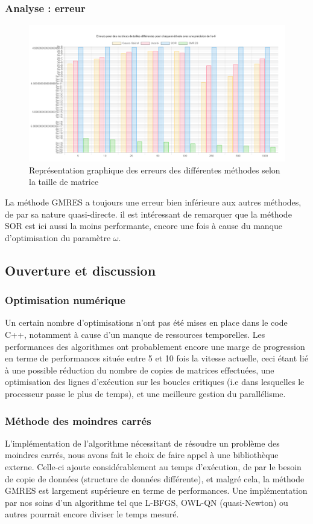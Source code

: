 \subsubsection{Analyse : erreur}
\begin{figure}[H]
	\centering
	\includegraphics[width=0.8\linewidth]{images/errors.PNG}
	\caption{Représentation graphique des erreurs des différentes méthodes selon la taille de matrice}
\end{figure}

La méthode GMRES a toujours une erreur bien inférieure aux autres méthodes, de par sa nature quasi-directe. il est intéressant de remarquer que la méthode SOR est ici aussi la moins performante, encore une fois à cause du manque d'optimisation du paramètre $\omega$.



\subsection{Ouverture et discussion}
\subsubsection{Optimisation numérique}
Un certain nombre d'optimisations n'ont pas été mises en place dans le code C++, notamment à cause d'un manque de ressources temporelles. Les performances des algorithmes ont probablement encore une marge de progression en terme de performances située entre 5 et 10 fois la vitesse actuelle, ceci étant lié à une possible réduction du nombre de copies de matrices effectuées, une optimisation des lignes d'exécution sur les boucles critiques (i.e dans lesquelles le processeur passe le plus de temps), et une meilleure gestion du parallélisme.


\subsubsection{Méthode des moindres carrés}
L'implémentation de l'algorithme nécessitant de résoudre un problème des moindres carrés, nous avons fait le choix de faire appel à une bibliothèque externe. Celle-ci ajoute considérablement au temps d'exécution, de par le besoin de copie de données (structure de données différente), et malgré cela, la méthode GMRES est largement supérieure en terme de performances. Une implémentation par nos soins d'un algorithme tel que L-BFGS, OWL-QN (quasi-Newton) ou autres pourrait encore diviser le temps mesuré.


